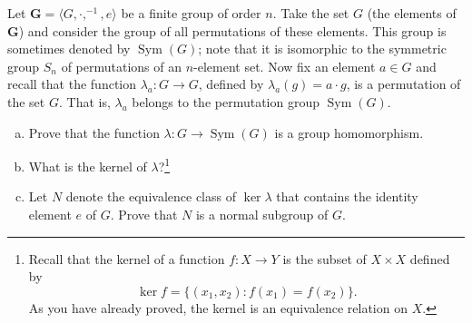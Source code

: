 \documentclass[12pt,reqno]{amsart}
\newcommand{\bG}{\ensuremath{\mathbf{G}}}
\newcommand{\<}{\ensuremath{\langle}}
\renewcommand{\>}{\ensuremath{\rangle}}
\newcommand{\Sym}{\ensuremath{\operatorname{Sym}}}
\begin{document}
 Let $\bG = \<G, \cdot, ^{-1}, e\>$ be a finite group of order $n$.  
Take the set $G$ (the elements of $\bG$) and consider the group of all
permutations of these elements.  This group is sometimes denoted by $\Sym(G)$;
note that it is isomorphic to the symmetric group $S_n$ of permutations of
an $n$-element set.
Now fix an element $a\in G$ and recall that the function
$\lambda_a: G \rightarrow G$, defined by $\lambda_a(g) = a\cdot g$, is a
permutation of the set $G$.  That is, $\lambda_a$ belongs to the
permutation group $\Sym(G)$.


\bigskip

\begin{enumerate}[(a)]
\item 
Prove that the function $\lambda: G \rightarrow \Sym(G)$ is a group
homomorphism.  

\bigskip

\item What is the kernel of $\lambda$?\footnote{Recall that the kernel of a function $f: X \rightarrow Y$ is the subset of
  $X\times X$ defined by 
\[
\ker f = \{(x_1,x_2) : f(x_1) = f(x_2)\}.
\]
As you have already proved, the kernel is an equivalence relation on $X$.}


\bigskip

\item Let $N$ denote the equivalence class of $\ker\lambda$ that contains the
  identity element $e$ of $G$.  Prove that $N$ is a normal subgroup of $G$.
\end{enumerate}
\end{document}
